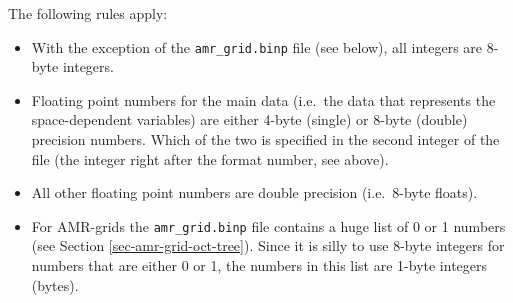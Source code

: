 \documentclass{report}
\begin{document}
The following rules apply:
\begin{itemize}
\item With the exception of the {\small\tt amr\_grid.binp} file (see below),
  all integers are 8-byte integers. 
\item Floating point numbers for the main data (i.e.\ the data that
  represents the space-dependent variables) are either 4-byte (single) or
  8-byte (double) precision numbers. Which of the two is specified in the
  second integer of the file (the integer right after the format number,
  see above).
\item All other floating point numbers are double precision (i.e.\ 8-byte
  floats).
\item For AMR-grids the {\small\tt amr\_grid.binp} file contains a huge list
  of 0 or 1 numbers (see Section \ref{sec-amr-grid-oct-tree}). Since it is
  silly to use 8-byte integers for numbers that are either 0 or 1, the 
  numbers in this list are 1-byte integers (bytes). 
\end{itemize}
\end{document}
